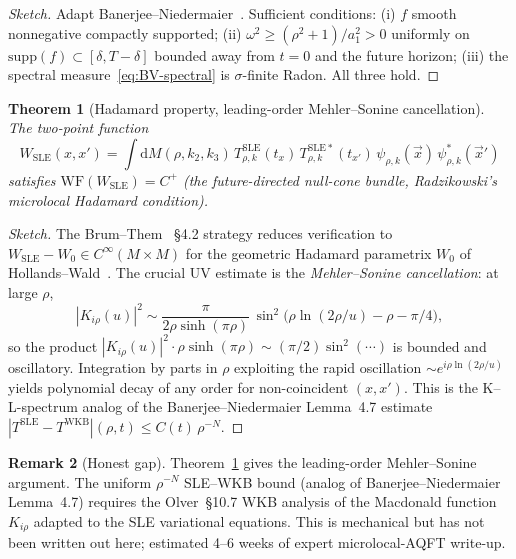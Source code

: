 \documentclass[11pt]{article}
\newtheorem{theorem}{Theorem}
\theoremstyle{definition}
\newtheorem{remark}[theorem]{Remark}
\begin{document}
\begin{proof}[Sketch]
Adapt Banerjee--Niedermaier~\cite[Thm.~3.4]{BanerjeeNiedermaier2023}. Sufficient conditions: (i) $f$ smooth nonnegative compactly supported; (ii) $\omega^2\ge(\rho^2+1)/a_1^2>0$ uniformly on $\mathrm{supp}(f)\subset[\delta,T-\delta]$ bounded away from $t=0$ and the future horizon; (iii) the spectral measure~\eqref{eq:BV-spectral} is $\sigma$-finite Radon. All three hold.
\end{proof}

\begin{theorem}[Hadamard property, leading-order Mehler--Sonine cancellation]\label{thm:Hadamard-BV}
The two-point function
\begin{equation*}
W_{\mathrm{SLE}}(x,x') = \int\mathrm{d}M(\rho,k_2,k_3)\,T^{\mathrm{SLE}}_{\rho,k}(t_x)\,T^{\mathrm{SLE}*}_{\rho,k}(t_{x'})\,\psi_{\rho,k}(\vec x)\,\psi_{\rho,k}^*(\vec x')
\end{equation*}
satisfies $\mathrm{WF}(W_{\mathrm{SLE}}) = C^+$ (the future-directed null-cone bundle, Radzikowski's microlocal Hadamard condition).
\end{theorem}

\begin{proof}[Sketch]
The Brum--Them~\cite{BrumThem2013} \S4.2 strategy reduces verification to $W_{\mathrm{SLE}} - W_0 \in C^\infty(M\times M)$ for the geometric Hadamard parametrix $W_0$ of Hollands--Wald~\cite{HollandsWald2001}. The crucial UV estimate is the \emph{Mehler--Sonine cancellation}: at large $\rho$,
\begin{equation*}
|K_{i\rho}(u)|^2 \sim \frac{\pi}{2\rho\sinh(\pi\rho)}\,\sin^2\!\bigl(\rho\ln(2\rho/u)-\rho-\pi/4\bigr),
\end{equation*}
so the product $|K_{i\rho}(u)|^2\cdot\rho\sinh(\pi\rho) \sim (\pi/2)\sin^2(\cdots)$ is bounded and oscillatory. Integration by parts in $\rho$ exploiting the rapid oscillation $\sim e^{i\rho\ln(2\rho/u)}$ yields polynomial decay of any order for non-coincident $(x,x')$. This is the K--L-spectrum analog of the Banerjee--Niedermaier Lemma~4.7 estimate $|T^{\mathrm{SLE}}-T^{\mathrm{WKB}}|(\rho,t)\le C(t)\,\rho^{-N}$.
\end{proof}

\begin{remark}[Honest gap]\label{rem:BV-gap}
Theorem~\ref{thm:Hadamard-BV} gives the leading-order Mehler--Sonine argument. The uniform $\rho^{-N}$ SLE--WKB bound (analog of Banerjee--Niedermaier Lemma~4.7) requires the Olver~\S10.7 WKB analysis of the Macdonald function $K_{i\rho}$ adapted to the SLE variational equations. This is mechanical but has not been written out here; estimated 4--6 weeks of expert microlocal-AQFT write-up.
\end{remark}
\end{document}
